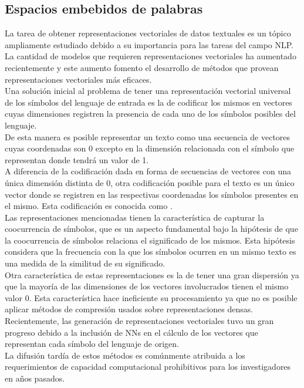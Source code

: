 \documentclass{article}
\begin{document}
	\subsection{Espacios embebidos de palabras}
	La tarea de obtener representaciones vectoriales de datos textuales es un tópico ampliamente estudiado\cite{35MikolovRecurrentEmbeddings} debido a su importancia para las tareas del campo NLP.\\
	La cantidad de modelos que requieren representaciones vectoriales ha aumentado recientemente y este aumento fomento el desarrollo de métodos que provean representaciones vectoriales más eficaces\cite{36MikolovImprovement}.\\
	
	Una solución inicial al problema de tener una representación vectorial universal de los símbolos del lenguaje de entrada es la de codificar los mismos en vectores cuyas dimensiones registren la presencia de cada uno de los símbolos posibles del lenguaje.\\
	De esta manera es posible representar un texto como una secuencia de vectores cuyas coordenadas son 0 excepto en la dimensión relacionada con el símbolo que representan donde tendrá un valor de 1. \\
	A diferencia de la codificación dada en forma de secuencias de vectores con una única dimensión distinta de 0, otra codificación posible para el texto es un único vector donde se registren en las respectivas coordenadas los símbolos presentes en el mismo. Esta codificación es conocida como .\\
	
	Las representaciones mencionadas tienen la característica de capturar la coocurrencia de símbolos, que es un aspecto fundamental bajo la hipótesis de que la coocurrencia de símbolos relaciona el significado de los mismos. Esta hipótesis considera que la frecuencia con la que los símbolos ocurren en un mismo texto es una medida de la similitud de su significado.\\
	Otra característica de estas representaciones es la de tener una gran dispersión ya que la mayoría de las dimensiones de los vectores involucrados tienen el mismo valor 0. Esta característica hace ineficiente su procesamiento ya que no es posible aplicar métodos de compresión usados sobre representaciones densas\cite{60TeoricCorrespondenceOfWordEmbeddings}.\\
	
	Recientemente, las generación de representaciones vectoriales tuvo un gran progreso debido a la inclusión de NNs en el cálculo de los vectores que representan cada símbolo del lenguaje de origen\cite{37BengioNeuralEmbedding, 38MikolovFormer, 39GlovePennington}.\\
	La difusión tardía de estos métodos es comúnmente atribuida a los requerimientos de capacidad computacional prohibitivos para los investigadores en años pasados.\\
	
\end{document}
